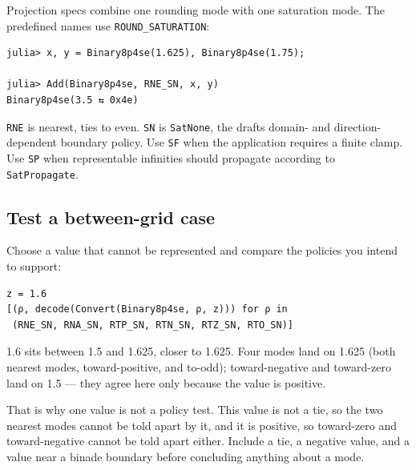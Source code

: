 \label{17602185181796058740}{}


Projection specs combine one rounding mode with one saturation mode. The predefined names use \texttt{ROUND\_\allowbreak{}SATURATION}:




\nopagebreak[4]
\begin{verbatim}
julia> x, y = Binary8p4se(1.625), Binary8p4se(1.75);

julia> Add(Binary8p4se, RNE_SN, x, y)
Binary8p4se(3.5 ⇆ 0x4e)
\end{verbatim}



\texttt{RNE} is nearest, ties to even. \texttt{SN} is \texttt{SatNone}, the draft{\textquotesingle}s domain- and direction-dependent boundary policy. Use \texttt{SF} when the application requires a finite clamp. Use \texttt{SP} when representable infinities should propagate according to \texttt{SatPropagate}.



\subsection{Test a between-grid case}



\label{15969813749213620692}{}


Choose a value that cannot be represented and compare the policies you intend to support:




\nopagebreak[4]
\begin{verbatim}
z = 1.6
[(ρ, decode(Convert(Binary8p4se, ρ, z))) for ρ in
 (RNE_SN, RNA_SN, RTP_SN, RTN_SN, RTZ_SN, RTO_SN)]
\end{verbatim}



1.6 sits between 1.5 and 1.625, closer to 1.625. Four modes land on 1.625 (both nearest modes, toward-positive, and to-odd); toward-negative and toward-zero land on 1.5 — they agree here only because the value is positive.



That is why one value is not a policy test. This value is not a tie, so the two nearest modes cannot be told apart by it, and it is positive, so toward-zero and toward-negative cannot be told apart either. Include a tie, a negative value, and a value near a binade boundary before concluding anything about a mode.




